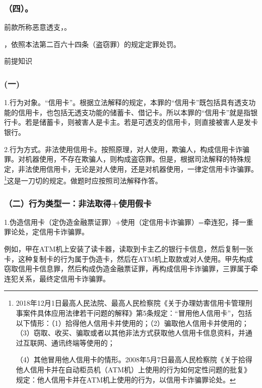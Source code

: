 \subsubsection*{（四）。}

前款所称恶意透支，。

，依照本法第二百六十四条（盗窃罪）的规定定罪处罚。

前提知识

\subsubsection*{(一)}

1.行为对象。“信用卡”。根据立法解释的规定，本罪的“信用卡”既包括具有透支功能的信用卡，也包括无透支功能的储蓄卡、借记卡。所以本罪的“信用卡”就是指银行卡。若是储蓄卡，则被害人是卡主。若是可透支的信用卡，则直接被害人是发卡银行。

2.行为方式。非法使用信用卡。按照原理，对人使用，欺骗人，构成信用卡诈骗罪。对机器使用，不存在欺骗人，则构成盗窃罪。但是，根据司法解释的特殊规定，非法使用信用卡，无论是对人使用，还是对机器使用，一律定信用卡诈骗罪。\footnote{2018年12月1日最高人民法院、最高人民检察院《关于办理妨害信用卡管理刑事案件具体应用法律若干问题的解释》第5条规定：“冒用他人信用卡”，包括以下情形：（1）拾得他人信用卡并使用的；（2）骗取他人信用卡并使用的；（3）窃取、收买、骗取或者以其他非法方式获取他人信用卡信息资料，并通过互联网、通讯终端等使用的；

（4）其他冒用他人信用卡的情形。2008年5月7日最高人民检察院《关于拾得他人信用卡并在自动柜员机（ATM机）上使用的行为如何定性问题的批复》规定：他人信用卡并在ATM机上使用的行为，以信用卡诈骗罪论处。}这是一刀切的规定。做题时应按照司法解释作答。

\subsubsection*{（二）行为类型一：非法取得+使用假卡}

1.伪造信用卡（定伪造金融票证罪）+使用（定信用卡诈骗罪）=牵连犯，择一重罪论处，定信用卡诈骗罪。

例如，甲在ATM机上安装了读卡器，读取到卡主乙的银行卡信息，然后复制一张卡，这种复制卡的行为属于伪造卡，然后在ATM机上取款或对人使用。甲先构成窃取信用卡信息罪，然后构成伪造金融票证罪，再构成信用卡诈骗罪，三罪属于牵连犯关系，最终定信用卡诈骗罪。

